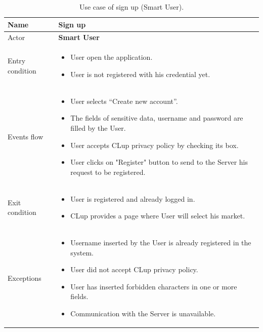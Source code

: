 \bigbreak
\begin{table}[H]\begin{tabular}{|p{5cm} | p{7cm} | }
	\hline
	Name & \textbf{Sign up} \\
	\hline
	Actor & \textbf{Smart User} \\
	\hline
	Entry condition &
	\begin{itemize}
		\item User open the application.
        \item User is not registered with his credential yet. 
	\end{itemize} \\
	\hline
	Events flow & 
	\begin{itemize}
		\item User selects “Create new account”.
		\item The fields of sensitive data, username and password are filled by the User.
		\item User accepts CLup privacy policy by checking its box.
		\item User clicks on "Register" button to send to the Server his request to be registered.
	\end{itemize} \\
	\hline
	Exit condition & \begin{itemize} 
    \item User is registered and already logged in. 
    \item CLup provides a page where User will select his market.
    \end{itemize}\\
	\hline 
	Exceptions &
	\begin{itemize}
		\item Username inserted by the User is already registered in the system.
		\item User did not accept CLup privacy policy.
		\item User has inserted forbidden characters in one or more fields.
        \item Communication with the Server is unavailable.
	\end{itemize} \\
	\hline
\end{tabular}
\caption{Use case of sign up (Smart User).}
\end{table}

\bigbreak

